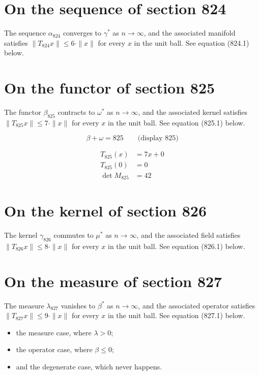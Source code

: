 \documentclass{article}
\begin{document}
\section{On the sequence of section 824}
The sequence $\alpha_{824}$ converges to $\gamma^{*}$ as $n \to \infty$,
and the associated manifold satisfies $\|T_{824} x\| \leq 6 \cdot \|x\|$
for every $x$ in the unit ball. See equation (824.1) below.

\section{On the functor of section 825}
The functor $\beta_{825}$ contracts to $\omega^{*}$ as $n \to \infty$,
and the associated kernel satisfies $\|T_{825} x\| \leq 7 \cdot \|x\|$
for every $x$ in the unit ball. See equation (825.1) below.

$$
\beta + \omega = 825 \qquad \text{(display 825)}
$$

\begin{align}
T_{825}(x) &= 7 x + 0 \\
T_{825}(0) &= 0 \\
\det M_{825} &= 42
\end{align}

\section{On the kernel of section 826}
The kernel $\gamma_{826}$ commutes to $\mu^{*}$ as $n \to \infty$,
and the associated field satisfies $\|T_{826} x\| \leq 8 \cdot \|x\|$
for every $x$ in the unit ball. See equation (826.1) below.

\section{On the measure of section 827}
The measure $\lambda_{827}$ vanishes to $\beta^{*}$ as $n \to \infty$,
and the associated operator satisfies $\|T_{827} x\| \leq 9 \cdot \|x\|$
for every $x$ in the unit ball. See equation (827.1) below.

\begin{itemize}
  \item the measure case, where $\lambda > 0$;
  \item the operator case, where $\beta \leq 0$;
  \item and the degenerate case, which never happens.
\end{itemize}
\end{document}
